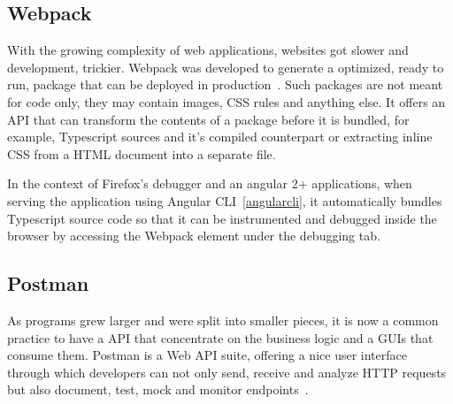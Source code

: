 \subsection{Webpack}
With the growing complexity of web applications, websites got slower and development, trickier. Webpack was developed to generate a optimized, ready to run, package that can be deployed in production~\cite{webpack}. Such packages are not meant for code only, they may contain images, \gls{CSS} rules and anything else. It offers an \gls{API} that can transform the contents of a package before it is bundled, for example, Typescript sources and it's compiled counterpart or extracting inline \gls{CSS} from a \gls{HTML} document into a separate file.

In the context of Firefox's debugger and an angular 2+ applications, when serving the application using Angular \gls{CLI}~\ref{angularcli}, it automatically bundles Typescript source code so that it can be instrumented and debugged inside the browser by accessing the Webpack element under the debugging tab.
\subsection{Postman}
As programs grew larger and were split into smaller pieces, it is now a common practice to have a \gls{API} that concentrate on the business logic and a \gls{GUI}s that consume them. Postman is a Web \gls{API} suite, offering a nice user interface through which developers can not only send, receive and analyze \gls{HTTP} requests but also document, test, mock and monitor endpoints~\cite{postman}.

